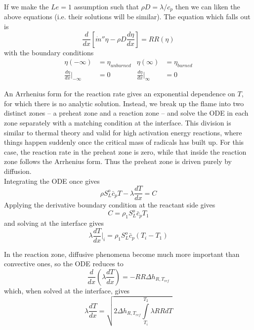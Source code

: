 \documentclass[11pt]{article}
\newcommand{\intlim}[2]{\int\limits_{#1}^{#2}}
\begin{document}
If we make the $Le=1$ assumption such that $\rho D = \lambda/c_p$ then we can liken the above equations (i.e. their solutions will be similar). The equation which falls out is
$$\frac{d}{dx}\left[\dot m''\eta - \rho D\frac{d\eta}{dx}\right] = RR(\eta)$$
with the boundary conditions
\begin{align*}
\eta(-\infty) &= \eta_{unburned} &\eta(\infty) &= \eta_{burned}\\
\frac{d\eta}{dx}\Big|_{-\infty} &= 0 &\frac{d\eta}{dx}\Big|_{\infty} &= 0
\end{align*}

An Arrhenius form for the reaction rate gives an exponential dependence on $T$, for which there is no analytic solution. Instead, we break up the flame into two distinct zones -- a preheat zone and a reaction zone -- and solve the ODE in each zone separately with a matching condition at the interface. This division is similar to thermal theory and valid for high activation energy reactions, where things happen suddenly once the critical mass of radicals has built up. For this case, the reaction rate in the preheat zone is zero, while that inside the reaction zone follows the Arrhenius form. Thus the preheat zone is driven purely by diffusion.\\

Integrating the ODE once gives
$$\rho S_L^o\bar c_p T - \lambda\frac{dT}{dx} = C$$
Applying the derivative boundary condition at the reactant side gives
$$C = \rho_1S_L^o\bar c_pT_1$$
and solving at the interface gives
$$\lambda\frac{dT}{dx}\Big|_i = \rho_1S_L^o\bar c_p(T_i-T_1)$$

In the reaction zone, diffusive phenomena become much more important than convective ones, so the ODE reduces to
$$\frac{d}{dx}\left(\lambda\frac{dT}{dx}\right) = -RR\Delta h_{R,T_{ref}}$$
which, when solved at the interface, gives
$$\lambda\frac{dT}{dx} = \sqrt{2\Delta h_{R,T_{ref}}\intlim{T_i}{T_2}\lambda RRdT}$$
\end{document}

